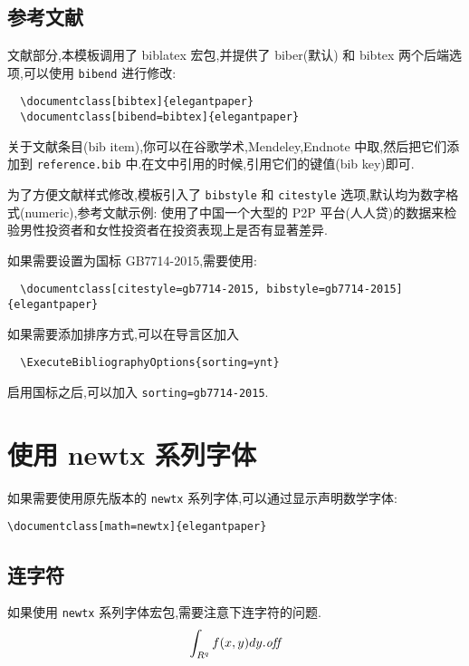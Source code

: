 \documentclass[lang=cn,a4paper]{elegantpaper}
\begin{document}
\subsection{参考文献}

文献部分,本模板调用了 biblatex 宏包,并提供了 biber(默认) 和 bibtex 两个后端选项,可以使用 \lstinline{bibend} 进行修改:

\begin{lstlisting}
  \documentclass[bibtex]{elegantpaper}
  \documentclass[bibend=bibtex]{elegantpaper}
\end{lstlisting}

关于文献条目(bib item),你可以在谷歌学术,Mendeley,Endnote 中取,然后把它们添加到 \lstinline{reference.bib} 中.在文中引用的时候,引用它们的键值(bib key)即可.

为了方便文献样式修改,模板引入了 \lstinline{bibstyle} 和 \lstinline{citestyle} 选项,默认均为数字格式(numeric),参考文献示例:\cite{cn1,en2,en3} 使用了中国一个大型的 P2P 平台(人人贷)的数据来检验男性投资者和女性投资者在投资表现上是否有显著差异.

如果需要设置为国标 GB7714-2015,需要使用:
\begin{lstlisting}
  \documentclass[citestyle=gb7714-2015, bibstyle=gb7714-2015]{elegantpaper} 
\end{lstlisting}

如果需要添加排序方式,可以在导言区加入
\begin{lstlisting}
  \ExecuteBibliographyOptions{sorting=ynt}
\end{lstlisting}

启用国标之后,可以加入 \lstinline{sorting=gb7714-2015}.


\section{使用 newtx 系列字体}

如果需要使用原先版本的 \lstinline{newtx} 系列字体,可以通过显示声明数学字体:

\begin{lstlisting}
\documentclass[math=newtx]{elegantpaper}
\end{lstlisting}

\subsection{连字符}

如果使用 \lstinline{newtx} 系列字体宏包,需要注意下连字符的问题.
\begin{equation}
  \int_{R^q} f(x,y) dy.\emph{of\kern0pt f}
\end{equation}
\end{document}

